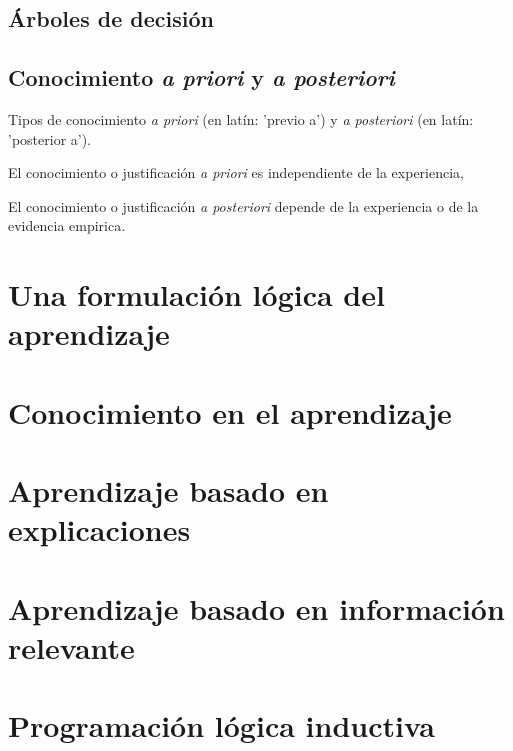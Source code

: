 \documentclass[12 pt, a4paper]{article}
\begin{document}
		\subsection{Árboles de decisión}	
			
			
		\subsection{Conocimiento \emph{a priori} y \emph{a posteriori}}
			Tipos de conocimiento \emph{a priori} (en latín: 'previo a') y \emph{a posteriori} (en latín: 'posterior a'). 
			
			El conocimiento o justificación \emph{a priori} es independiente de la experiencia, 
			
			El conocimiento o justificación \emph{a posteriori} depende de la experiencia o de la evidencia empirica.
				 
	\section{Una formulación lógica del aprendizaje}
		
	\section{Conocimiento en el aprendizaje}
	 
	 \section{Aprendizaje basado en explicaciones}
	 
	 \section{Aprendizaje basado en información relevante}
	
	 \section{Programación lógica inductiva}
	 
\end{document}
